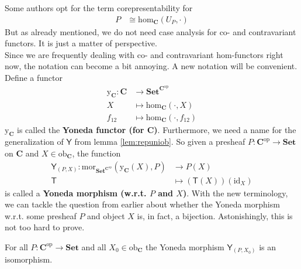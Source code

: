 Some authors opt for the term {\glqq}corepresentability{\grqq} for
\begin{align*}
  P
  &\cong
  \mathrm{hom}_{\mathbf{C}}(U_{P},\cdot)
\end{align*}
But as already mentioned, we do not need case analysis for co- and contravariant functors.
It is just a matter of perspective.
\\
Since we are frequently dealing with co- and contravariant hom-functors right now, the notation can become a bit annoying.
A new notation will be convenient.
Define a functor
\begin{align*}
  \mathrm{y}_{\mathbf{C}}
  \colon
  \mathbf{C}
  &\rightarrow
  \mathbf{Set}^{\mathbf{C}^{\mathrm{op}}}
  \\
  X
  &\mapsto
  \mathrm{hom}_{\mathbf{C}}(\cdot,X)
  \\
  f_{12}
  &\mapsto
  \mathrm{hom}_{\mathbf{C}}(\cdot,f_{12})
\end{align*}
$\mathrm{y}_{\mathbf{C}}$ is called the \textbf{Yoneda functor (for $\mathbf{C}$)}.
Furthermore, we need a name for the generalization of $\mathsf{Y}$ from lemma \ref{lem:repuniob}.
So given a presheaf $P \colon \mathbf{C}^{\mathrm{op}} \rightarrow \mathbf{Set}$ on $\mathbf{C}$ and $X \in \mathrm{ob}_{\mathbf{C}}$, the function
\begin{align*}
  \mathsf{Y}_{(P,X)}
  \colon
  \mathrm{mor}_{\mathbf{Set}^{\mathbf{C}^{\mathrm{op}}}}
  (\mathrm{y}_{\mathbf{C}}(X),P)
  &\rightarrow
  P(X)
  \\
  \mathsf{T}
  &\mapsto
  (\mathsf{T}(X))(\mathrm{id}_{X})
\end{align*}
is called a \textbf{Yoneda morphism (w.r.t. $P$ and $X$)}.
With the new terminology, we can tackle the question from earlier about whether the Yoneda morphism w.r.t. some presheaf $P$ and object $X$ is, in fact, a bijection.
Astonishingly, this is not too hard to prove.
\\
\begin{lem}[Yoneda]
\label{lem:yoneda}
For all $P \colon \mathbf{C}^{\mathrm{op}} \rightarrow \mathbf{Set}$ and all $X_{0} \in \mathrm{ob}_{\mathbf{C}}$ the Yoneda morphism $\mathsf{Y}_{(P,X_{0})}$ is an isomorphism.
\end{lem}
